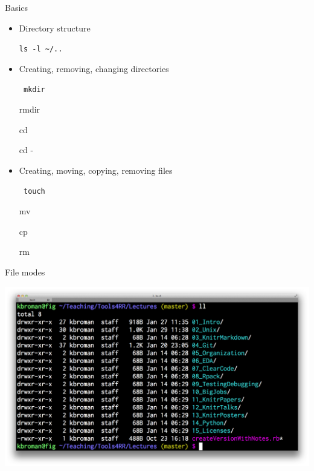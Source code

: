 \documentclass[12pt,t]{beamer}
\newcommand{\bi}{\begin{itemize}}
\newcommand{\ei}{\end{itemize}}
\begin{document}
\begin{frame}{Basics}

\vspace{18pt}
\bi
\itemsep18pt
\item Directory structure

{\color{lolight} \tt ls -l {\textasciitilde}/.. }

\item Creating, removing, changing directories

{\tt \color{lolight} mkdir 

rmdir

cd

cd -}

\item Creating, moving, copying, removing files

{\tt \color{lolight} touch 

mv 

cp 

rm}

\ei


\end{frame}


\begin{frame}[c]{File modes}

\centerline{\includegraphics[width=\textwidth]{Figs/chmod.png}}


\end{frame}
\end{document}
